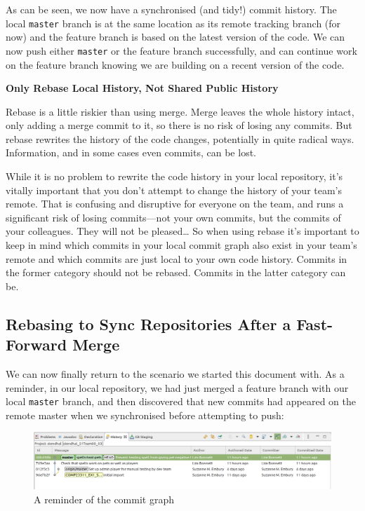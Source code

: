 \documentclass[
]{book}
\begin{document}
As can be seen, we now have a synchronised (and tidy!) commit history. The local \texttt{master} branch is at the same location as its remote tracking branch (for now) and the feature branch is based on the latest version of the code. We can now push either \texttt{master} or the feature branch successfully, and can continue work on the feature branch knowing we are building on a recent version of the code.

\textbf{Only Rebase Local History, Not Shared Public History}

Rebase is a little riskier than using merge. Merge leaves the whole history intact, only adding a merge commit to it, so there is no risk of losing any commits. But rebase rewrites the history of the code changes, potentially in quite radical ways. Information, and in some cases even commits, can be lost.

While it is no problem to rewrite the code history in your local repository, it's vitally important that you don't attempt to change the history of your team's remote. That is confusing and disruptive for everyone on the team, and runs a significant risk of losing commits---not your own commits, but the commits of your colleagues. They will not be pleased\ldots{}
So when using rebase it's important to keep in mind which commits in your local commit graph also exist in your team's remote and which commits are just local to your own code history. Commits in the former category should not be rebased. Commits in the latter category can be.

\hypertarget{rebaseffm}{%
\subsection{Rebasing to Sync Repositories After a Fast-Forward Merge}\label{rebaseffm}}

We can now finally return to the scenario we started this document with. As a reminder, in our local repository, we had just merged a feature branch with our local \texttt{master} branch, and then discovered that new commits had appeared on the remote master when we synchronised before attempting to push:

\begin{figure}

{\centering \includegraphics[width=1\linewidth]{images/localCommitGraphAfterPushRejectedAndFetchNoHistory} 

}

\caption{A reminder of the commit graph}\label{fig:localCommitGraphAfterPushRejectedAndFetchNoHistory-fig}
\end{figure}
\end{document}
